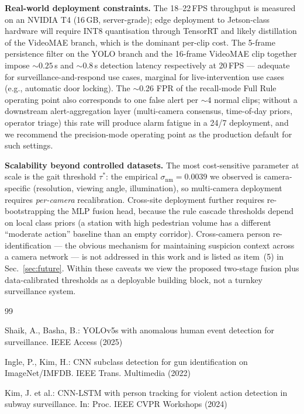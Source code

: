 \documentclass[runningheads]{llncs}
\begin{document}
\begin{algorithm}[!htbp]
\textbf{Real-world deployment constraints.} The 18--22\,FPS throughput is measured on an NVIDIA T4 (16\,GB, server-grade); edge deployment to Jetson-class hardware will require INT8 quantisation through TensorRT and likely distillation of the VideoMAE branch, which is the dominant per-clip cost. The 5-frame persistence filter on the YOLO branch and the 16-frame VideoMAE clip together impose $\sim 0.25\,$s and $\sim 0.8\,$s detection latency respectively at 20\,FPS --- adequate for surveillance-and-respond use cases, marginal for live-intervention use cases (e.g., automatic door locking). The $\sim$0.26 FPR of the recall-mode Full Rule operating point also corresponds to one false alert per $\sim 4$ normal clips; without a downstream alert-aggregation layer (multi-camera consensus, time-of-day priors, operator triage) this rate will produce alarm fatigue in a 24/7 deployment, and we recommend the precision-mode operating point as the production default for such settings.

\textbf{Scalability beyond controlled datasets.} The most cost-sensitive parameter at scale is the gait threshold $\tau^*$: the empirical $\sigma_\text{nm} = 0.0039$ we observed is camera-specific (resolution, viewing angle, illumination), so multi-camera deployment requires \emph{per-camera} recalibration. Cross-site deployment further requires re-bootstrapping the MLP fusion head, because the rule cascade thresholds depend on local class priors (a station with high pedestrian volume has a different ``moderate action'' baseline than an empty corridor). Cross-camera person re-identification --- the obvious mechanism for maintaining suspicion context across a camera network --- is not addressed in this work and is listed as item~(5) in Sec.~\ref{sec:future}. Within these caveats we view the proposed two-stage fusion plus data-calibrated thresholds as a deployable building block, not a turnkey surveillance system.


\begin{thebibliography}{99}

Shaik, A., Basha, B.: YOLOv5s with anomalous human event detection for surveillance. IEEE Access (2025)

Ingle, P., Kim, H.: CNN subclass detection for gun identification on ImageNet/IMFDB. IEEE Trans. Multimedia (2022)

Kim, J. et al.: CNN-LSTM with person tracking for violent action detection in subway surveillance. In: Proc. IEEE CVPR Workshops (2024)


\end{thebibliography}
\end{algorithm}
\end{document}
